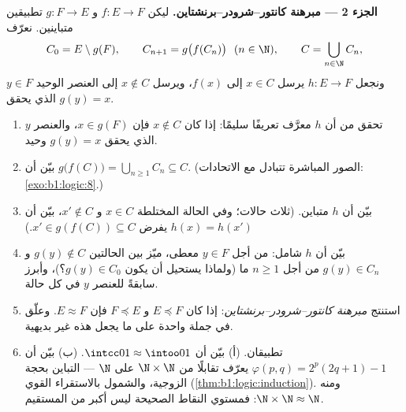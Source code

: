 \begin{problem}
\medskip
\noindent\textbf{الجزء 2 --- مبرهنة
كانتور--شرودر--برنشتاين.} ليكن $f \colon E \to F$ و $g \colon F \to E$
تطبيقين متباينين. نعرّف
\[
C_0 = E \setminus g(F), \qquad C_{n+1} = g\bigl(f(C_n)\bigr)
\ \ (n \in \N), \qquad C = \bigcup_{n \in \N} C_n,
\]
ونجعل $h \colon E \to F$ يرسل $x \in C$ إلى $f(x)$، ويرسل
$x \notin C$ إلى العنصر الوحيد $y \in F$ الذي يحقق $g(y) = x$.
\begin{enumerate}[resume]
  \item تحقق من أن $h$ معرَّف تعريفًا سليمًا: إذا كان $x \notin C$
        فإن $x \in
        g(F)$، والعنصر $y$ الذي يحقق $g(y) = x$ وحيد.
  \item بيّن أن $g\bigl(f(C)\bigr) = \bigcup_{n \geq 1} C_n
        \subseteq C$. (الصور المباشرة تتبادل مع الاتحادات:
        \cref{exo:b1:logic:8}.)
  \item بيّن أن $h$ متباين. (ثلاث حالات؛ وفي الحالة المختلطة
        $x \in C$ و $x' \notin C$، بيّن أن $h(x) = h(x')$ يفرض
        $x' \in g(f(C)) \subseteq C$.)
  \item بيّن أن $h$ شامل: من أجل $y \in F$ معطى، ميّز بين
        الحالتين $g(y) \notin C$ و $g(y) \in C_n$ من أجل $n
        \geq 1$ ما (ولماذا يستحيل أن يكون $g(y) \in C_0$؟)، وأبرز
        سابقةً للعنصر $y$ في كل حالة.
  \item استنتج \emph{مبرهنة كانتور--شرودر--برنشتاين}: إذا كان
        $E \preceq F$ و $F \preceq E$ فإن $E
        \approx F$. وعلّق في جملة واحدة على ما يجعل هذه 
        غير بديهية.
  \item تطبيقان. (أ) بيّن أن $\intcc01 \approx \intoo01$.
        (ب) بيّن أن $\varphi(p, q) = 2^p(2q + 1) - 1$ يعرّف
        تقابلًا من $\N \times \N$ على $\N$ --- التباين بحجة
        الزوجية، والشمول بالاستقراء القوي
        (\cref{thm:b1:logic:induction}). ومنه $\N \times \N \approx
        \N$: فمستوي النقاط الصحيحة ليس أكبر من
        المستقيم.
\end{enumerate}


\end{problem}
